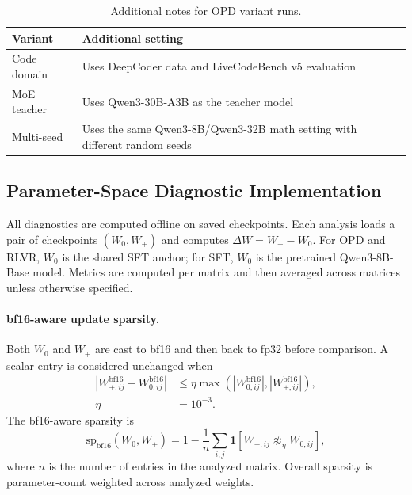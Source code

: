 \documentclass{llmxive}
\providecommand{\arraystretch}{1.05}
\begin{document}
\begin{table}[t]
\centering
\small
\setlength{\tabcolsep}{4pt}
\renewcommand{\arraystretch}{1.08}
\begin{tabularx}{\linewidth}{@{}lX@{}}
\toprule
\textbf{Variant} & \textbf{Additional setting} \\
\midrule
Code domain & Uses DeepCoder data  and LiveCodeBench v5 evaluation \\
MoE teacher & Uses Qwen3-30B-A3B as the teacher model \\
Multi-seed & Uses the same Qwen3-8B/Qwen3-32B math setting with different random seeds \\
\bottomrule
\end{tabularx}
\caption{Additional notes for OPD variant runs.}
\label{tab:opd-variant-notes}
\end{table}

\subsection{Parameter-Space Diagnostic Implementation}
\label{app:diagnostic-implementation}

All diagnostics are computed offline on saved checkpoints. Each analysis
loads a pair of checkpoints $(W_0,W_+)$ and computes
$\Delta W = W_+ - W_0$. For OPD and RLVR, $W_0$ is the shared SFT anchor;
for SFT, $W_0$ is the pretrained Qwen3-8B-Base model. Metrics are computed
per matrix and then averaged across matrices unless otherwise specified.

\paragraph{bf16-aware update sparsity.}
Both $W_0$ and $W_+$ are cast to bf16 and then back to fp32 before
comparison. A scalar entry is considered unchanged when
\[
\begin{aligned}
    |W_{+,ij}^{\mathrm{bf16}} - W_{0,ij}^{\mathrm{bf16}}|
    &\le
    \eta
    \max\!\left(
    |W_{0,ij}^{\mathrm{bf16}}|,
    |W_{+,ij}^{\mathrm{bf16}}|
    \right), \\
    \eta &= 10^{-3}.
\end{aligned}
\]
The bf16-aware sparsity is
\[
    \mathrm{sp}_{\mathrm{bf16}}(W_0,W_+)
    =
    1 -
    \frac{1}{n}
    \sum_{i,j}
    \mathbf{1}\!\left[
    W_{+,ij}\not\approx_{\eta} W_{0,ij}
    \right],
\]
where $n$ is the number of entries in the analyzed matrix. Overall sparsity
is parameter-count weighted across analyzed weights.
\end{document}
